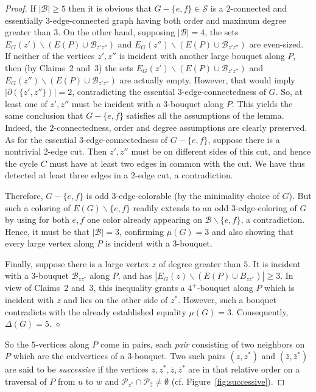 \documentclass[a4paper,12pt]{article}
\numberwithin{equation}{section}
\begin{document}
\begin{proof}
 If $|\mathcal{B}|\geq5$ then it is obvious that $G-\{e,f\}\in\mathcal{S}$ is a $2$-connected and essentially $3$-edge-connected graph having both order and maximum degree greater than $3$. On the other hand, supposing $|\mathcal{B}|=4$, the sets $E_G(z')\backslash(E(P)\cup \mathcal{B}_{z'z''})$ and $E_G(z'')\backslash(E(P)\cup \mathcal{B}_{z'z''})$ are even-sized. If neither of the vertices $z',z''$ is incident with another large bouquet along $P$, then (by Claims~2 and~3) the sets $E_G(z')\backslash(E(P)\cup \mathcal{B}_{z'z''})$ and $E_G(z'')\backslash(E(P)\cup \mathcal{B}_{z'z''})$ are actually empty. However, that would imply  $|\partial(\{z',z''\})|=2$, contradicting the essential $3$-edge-connectedness of $G$. So, at least one of $z',z''$ must be incident with a $3$-bouquet along $P$. This yields the same conclusion that $G-\{e,f\}$ satisfies all the assumptions of the lemma. Indeed, the $2$-connectedness, order and degree assumptions are clearly preserved. As for the essential $3$-edge-connectedness of $G-\{e,f\}$, suppose there is a nontrivial $2$-edge cut. Then $z',z''$ must be on different sides of this cut, and hence the cycle $C$ must have at least two edges in common with the cut. We have thus detected at least three edges in a $2$-edge cut, a contradiction.

  Therefore, $G-\{e,f\}$ is odd $3$-edge-colorable (by the minimality choice of $G$). But such a coloring of $E(G)\backslash\{e,f\}$ readily extends to an odd $3$-edge-coloring of $G$ by using for both $e,f$ one color already appearing on $\mathcal{B}\backslash\{e,f\}$, a contradiction. Hence, it must be that $|\mathcal{B}|=3$, confirming $\mu(G)=3$ and also showing that every large vertex along $P$ is incident with a $3$-bouquet.

Finally, suppose there is a large vertex $z$ of degree greater than $5$. It is incident with a $3$-bouquet $\mathcal{B}_{zz^*}$ along $P$, and has $|E_G(z)\backslash(E(P)\cup B_{zz^*})|\geq3$. In view of Claims~2 and~3, this inequality grants a $4^+$-bouquet along $P$ which is incident with $z$ and lies on the other side of $z^*$. However, such a bouquet contradicts with the already established equality $\mu(G)=3$. Consequently, $\Delta(G)=5$.
\hfill$\diamond$

\bigskip

So the $5$-vertices along $P$ come in pairs, each \textit{pair} consisting of two neighbors on $P$ which are the endvertices of a $3$-bouquet. Two such pairs $(z,z^*)$ and $(\bar{z},\bar{z}^*)$ are said to be \textit{successive} if the vertices $z,z^*,\bar{z},\bar{z}^*$ are in that relative order on a traversal of $P$ from $u$ to $w$ and $\mathcal{P}_{z^*}\cap\mathcal{P}_{\bar{z}}\neq\emptyset$ (cf. Figure~\ref{fig:successive}).


\end{proof}
\end{document}
